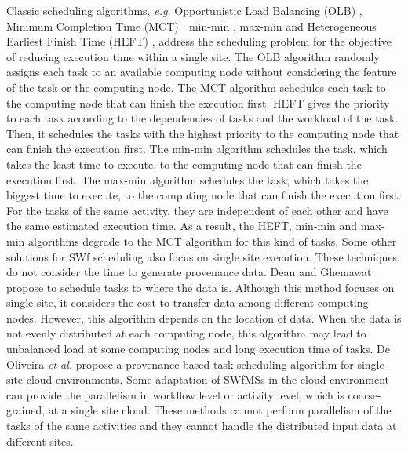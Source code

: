 Classic scheduling algorithms, \textit{e.g.} Opportunistic Load Balancing (OLB) \cite{Maheswaran1999}, Minimum Completion Time (MCT) \cite{Maheswaran1999}, min-min \cite{Etminani2007}, max-min \cite{Etminani2007} and Heterogeneous Earliest Finish Time (HEFT) \cite{Wieczorek2005}, address the scheduling problem for the objective of reducing execution time within a single site. 
The OLB algorithm randomly assigns each task to an available computing node without considering the feature of the task or the computing node. 
The MCT algorithm schedules each task to the computing node that can finish the execution first.
HEFT gives the priority to each task according to the dependencies of tasks and the workload of the task. Then, it schedules the tasks with the highest priority to the computing node that can finish the execution first. 
The min-min algorithm schedules the task, which takes the least time to execute, to the computing node that can finish the execution first.
The max-min algorithm schedules the task, which takes the biggest time to execute, to the computing node that can finish the execution first.
For the tasks of the same activity, they are independent of each other and have the same estimated execution time. 
As a result, the HEFT, min-min and max-min algorithms degrade to the MCT algorithm for this kind of tasks. Some other solutions \cite{Smanchat2009}\cite{Topcuouglu2002}\cite{Yu2007} for SWf scheduling also focus on single site execution. These techniques do not consider the time to generate provenance data. 
Dean and Ghemawat \cite{Dean2004} propose to schedule tasks to where the data is. 
Although this method focuses on single site, it considers the cost to transfer data among different computing nodes. However, this algorithm depends on the location of data. When the data is not evenly distributed at each computing node, this algorithm may lead to unbalanced load at some computing nodes and long execution time of tasks.
De Oliveira \textit{et al.} \cite{Oliveira2012} propose a provenance based task scheduling algorithm for single site cloud environments. 
Some adaptation of SWfMSs \cite{Bhuvaneshwar2015}\cite{Cala2014} in the cloud environment can provide the parallelism in workflow level or activity level, which is coarse-grained, at a single site cloud. These methods cannot perform parallelism of the tasks of the same activities and they cannot handle the distributed input data at different sites. 

